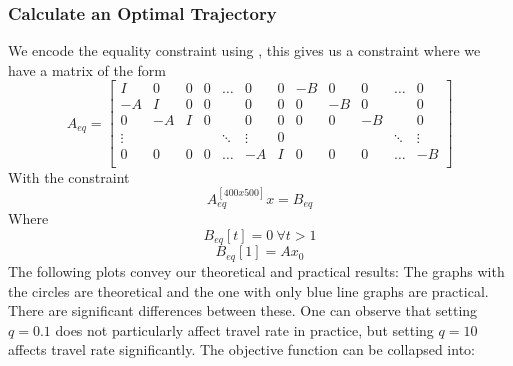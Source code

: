 \subsubsection{Calculate an Optimal Trajectory}
We encode the equality constraint using , this gives us a constraint where we have a matrix of the form
\begin{equation}
A_{eq} =
\begin{bmatrix}
    I      & 0  & 0 & 0 & \hdots & 0      & 0  & -B & 0  & 0  & \hdots & 0\\
    -A     & I  & 0 & 0 &        & 0      & 0  & 0  & -B & 0  &        & 0\\
    0      & -A & I & 0 &        & 0      & 0  & 0  & 0  & -B &        & 0\\
    \vdots &    &   &   & \ddots & \vdots & 0  &    &    &    & \ddots & \vdots\\
    0      & 0  & 0 & 0 & \hdots & -A     & I  & 0  & 0  & 0  & \hdots & -B\\
\end{bmatrix}
\end{equation}
With the constraint
\begin{equation}
{A}_{eq}^{[400x500]} {x} = {B}_{eq}
\end{equation}
Where
\begin{equation}
{B}_{eq}[t] = {0}\ \forall t > 1
\end{equation}
\begin{equation}
{B}_{eq}[1] = Ax_0
\end{equation}
The following plots convey our theoretical and practical results:
The graphs with the circles are theoretical and the one with only blue line graphs are practical. There are significant differences between these.
One can observe that setting $ q = 0.1 $ does not particularly affect travel rate in practice, but setting $ q = 10 $ affects travel rate significantly.
The objective function can be collapsed into:

